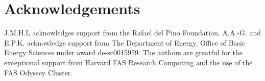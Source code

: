 \section{Acknowledgements}
J.M.H.L acknowledges support from the Rafael del Pino Foundation.
A.A.-G. and E.P.K. acknowledge support from The Department
of Energy, Office of Basic Energy Sciences under
award de-sc0015959. The
authors are greatful for the exceptional support from
Harvard FAS Research Computing and the use of the
FAS Odyssey Cluster.